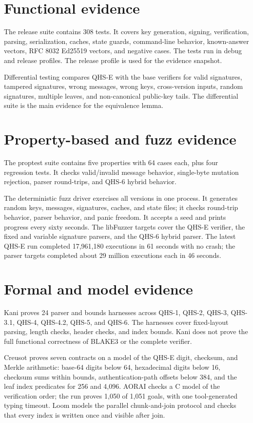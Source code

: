 \documentclass[11pt,a4paper]{article}
\theoremstyle{remark}
\begin{document}
\section{Functional evidence}

The release suite contains 308 tests. It covers key generation, signing,
verification, parsing, serialization, caches, state guards, command-line
behavior, known-answer vectors, RFC 8032 Ed25519 vectors, and negative cases.
The tests run in debug and release profiles. The release profile is used for
the evidence snapshot.

Differential testing compares QHS-E with the base verifiers for valid
signatures, tampered signatures, wrong messages, wrong keys, cross-version
inputs, random signatures, multiple leaves, and non-canonical public-key tails.
The differential suite is the main evidence for the equivalence lemma.

\section{Property-based and fuzz evidence}

The proptest suite contains five properties with 64 cases each, plus four
regression tests. It checks valid/invalid message behavior, single-byte mutation
rejection, parser round-trips, and QHS-6 hybrid behavior.

The deterministic fuzz driver exercises all versions in one process. It generates
random keys, messages, signatures, caches, and state files; it checks round-trip
behavior, parser behavior, and panic freedom. It accepts a seed and prints
progress every sixty seconds. The libFuzzer targets cover the QHS-E verifier,
the fixed and variable signature parsers, and the QHS-6 hybrid parser. The latest
QHS-E run completed 17,961,180 executions in 61 seconds with no crash; the parser
targets completed about 29 million executions each in 46 seconds.

\section{Formal and model evidence}

Kani proves 24 parser and bounds harnesses across QHS-1, QHS-2, QHS-3, QHS-3.1,
QHS-4, QHS-4.2, QHS-5, and QHS-6. The harnesses cover fixed-layout parsing,
length checks, header checks, and index bounds. Kani does not prove the full
functional correctness of BLAKE3 or the complete verifier.

Creusot proves seven contracts on a model of the QHS-E digit, checksum, and
Merkle arithmetic: base-64 digits below 64, hexadecimal digits below 16,
checksum sums within bounds, authentication-path offsets below 384, and the leaf
index predicates for 256 and 4,096. AORAI checks a C model of the verification
order; the run proves 1,050 of 1,051 goals, with one tool-generated typing
timeout. Loom models the parallel chunk-and-join protocol and checks that every
index is written once and visible after join.
\end{document}
